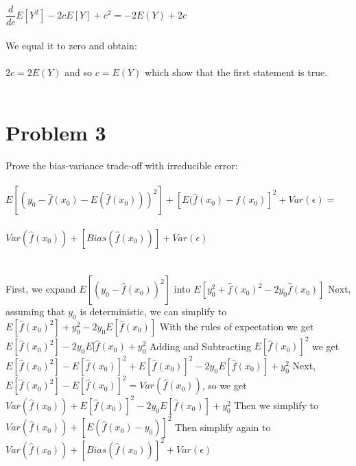 \documentclass[11pt,a4paper,twoside,openright]{report}
\begin{document}
	 
	$ \dfrac{d}{dc}E[Y^2] - 2cE[Y] + c^2 = -2E(Y) + 2c $ \\\\
	
	We equal it to zero and obtain:\\\\
	
	$2c = 2E(Y)$ and so $c = E(Y)$ which show that the first statement is true. \\\\
	
	
	\section*{Problem 3}
	
	Prove the bias-variance trade-off with irreducible error:\\\\
	
	
	
	$E[(y_{0} - \hat{f}(x_{0}) - E(\hat{f}(x_{0})))^2] + [E(\hat{f}(x_{0}) - f(x_{0})]^2 + Var(\epsilon) =$\\\\
	
	$Var(\hat{f}(x_{0})) + [Bias(\hat{f}(x_{0}))] + Var(\epsilon)$\\
	\\\\
	
  	First, we expand $E[(y_{0} - \hat{f}(x_{0}))^2]$ into $E[y_{0}^2 + \hat{f}(x_{0})^2 - 2y_{0}\hat{f}(x_{0})]$\newline
    	\newline
  	Next, assuming that $y_{0}$ is deterministic, we can simplify to $E[\hat{f}(x_{0})^2] + y_{0}^2 - 2y_{0}E[\hat{f}(x_{0})]$\newline
    	\newline
    	With the rules of expectation we get $E[\hat{f}(x_{0})^2] - 2y_{0}E[\hat{f}(x_{0}) + y_{0}^2$\newline
    	\newline
    	Adding and Subtracting $E[\hat{f}(x_{0})]^2$ we get
	$E[\hat{f}(x_{0})^2] - E[\hat{f}(x_{0})]^2 + E[\hat{f}(x_{0})]^2  - 2y_{0}E[\hat{f}(x_{0})] + y_{0}^2$\newline
    	\newline
   	 Next, $E[\hat{f}(x_{0})^2] - E[\hat{f}(x_{0})]^2 = Var(\hat{f}(x_{0}))$, so we get\newline 
    	\newline
    	$Var(\hat{f}(x_{0})) + E[\hat{f}(x_{0})]^2  - 2y_{0}E[\hat{f}(x_{0})] + y_{0}^2$\newline
    	\newline
    	Then we simplify to $Var(\hat{f}(x_{0})) + [E(\hat{f}(x_{0}) - y_{0})]^2$\newline
    	\newline
    	Then simplify again to $Var(\hat{f}(x_{0})) + [Bias(\hat{f}(x_{0}))]^2 + Var(\epsilon)$
	
	
	
	
	
	
	
	
	
	
	
	
	
	
	
	
	
	
	
	
	
\end{document}
